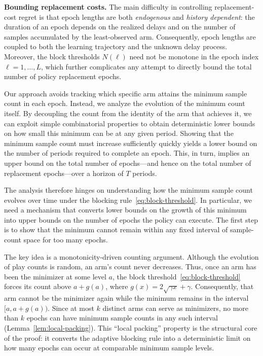 \documentclass[opre,blindrev]{informs3}
\begin{document}
\begin{APPENDICES}
{\bf Bounding replacement costs.}
The main difficulty in controlling replacement-cost regret is that epoch lengths are both \emph{endogenous} and \emph{history dependent}: the duration of an epoch depends on the realized delays and on the number of samples accumulated by the least-observed arm. Consequently, epoch lengths are coupled to both the learning trajectory and the unknown delay process. Moreover, the block thresholds \(N(\ell)\) need not be monotone in the epoch index \(\ell=1,\dots,L\), which further complicates any attempt to directly bound the total number of policy replacement epochs.

Our approach avoids tracking which specific arm attains the minimum sample count in each epoch. Instead, we analyze the evolution of the minimum count itself. By decoupling the count from the identity of the arm that achieves it, we can exploit simple combinatorial properties to obtain deterministic lower bounds on how small this minimum can be at any given period. Showing that the minimum sample count must increase sufficiently quickly yields a lower bound on the number of periods required to complete an epoch. This, in turn, implies an upper bound on the total number of epochs---and hence on the total number of replacement epochs---over a horizon of \(T\) periods.

The analysis therefore hinges on understanding how the minimum sample count evolves over time under the blocking rule~\eqref{eq:block-threshold}. In particular, we need a mechanism that converts lower bounds on the growth of this minimum into upper bounds on the number of epochs the policy can execute. The first step is to show that the minimum cannot remain within any fixed interval of sample-count space for too many epochs.

The key idea is a monotonicity-driven counting argument. Although the evolution of play counts is random, an arm's count never decreases. Thus, once an arm has been the minimizer at some level \(a\), the block threshold~\eqref{eq:block-threshold} forces its count above \(a+g(a)\), where \(g(x)=2\sqrt{\gamma x}+\gamma\). Consequently, that arm cannot be the minimizer again while the minimum remains in the interval \([a, a+g(a))\). Since at most \(k\) distinct arms can serve as minimizers, no more than \(k\) epochs can have minimum sample counts in any such interval (Lemma~\ref{lem:local-packing}). This ``local packing'' property is the structural core of the proof: it converts the adaptive blocking rule into a deterministic limit on how many epochs can occur at comparable minimum sample levels.


\end{APPENDICES}
\end{document}
